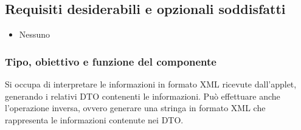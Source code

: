 \subsection*{Requisiti desiderabili e opzionali soddisfatti}
\begin{itemize}
    \item Nessuno
\end{itemize}
\subsubsection*{Tipo, obiettivo e funzione del componente}
Si occupa di interpretare le informazioni in formato XML ricevute dall'applet,
generando i relativi DTO contenenti le informazioni. Pu\`o effettuare anche
l'operazione inversa, ovvero generare una stringa in formato XML che rappresenta
le informazioni contenute nei DTO.
